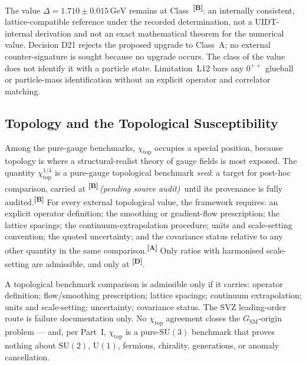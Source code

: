 \documentclass[12pt,a4paper,twoside]{article}
\theoremstyle{plain}
\theoremstyle{definition}
\theoremstyle{remark}
\newcommand{\GeV}{\,\mathrm{GeV}}
\newcommand{\catmark}[1]{\textsuperscript{\textsf{\textbf{[#1]}}}}
\newcommand{\Bpending}{\catmark{B}\,\textit{(pending source audit)}}
\newcommand{\DeltaGap}{1.710 \pm 0.015\GeV} %
\begin{document}
\begin{pioverridebox}
\label{box:pi-override-delta}
The value $\Delta=\DeltaGap$ remains at Class~\catmark{B}: an internally
consistent, lattice-compatible reference under the recorded determination,
not a UIDT-internal derivation and not an exact mathematical theorem for the
numerical value. Decision D21 rejects the proposed upgrade to Class~A; no
external counter-signature is sought because no upgrade occurs. The class of
the value does not identify it with a particle state. Limitation~L12 bars any
$0^{++}$ glueball or particle-mass identification without an explicit
operator and correlator matching.
\end{pioverridebox}

\subsection{Topology and the Topological Susceptibility}
\label{subsec:topology-chi}

Among the pure-gauge benchmarks, $\chi_{\mathrm{top}}$ occupies a
special position, because topology is where a structural-realist theory
of gauge fields is most exposed. The quantity
$\chi_{\mathrm{top}}^{1/4}$ is a pure-gauge topological benchmark
\emph{seed}: a target for post-hoc comparison, carried at \Bpending\
until its provenance is fully audited.\catmark{B} For every external
topological value, the framework requires: an explicit operator
definition; the smoothing or gradient-flow prescription; the lattice
spacings; the continuum-extrapolation procedure; units and scale-setting
convention; the quoted uncertainty; and the covariance status relative
to any other quantity in the same comparison.\catmark{A} Only ratios
with harmonised scale-setting are admissible, and only at \catmark{D}.

\begin{governancebox}
A topological benchmark comparison is admissible only if it carries:
operator definition; flow/smoothing prescription; lattice spacings;
continuum extrapolation; units and scale-setting; uncertainty;
covariance status. The SVZ leading-order route is failure documentation
only. No $\chi_{\mathrm{top}}$ agreement closes the
$G_{\mathrm{SM}}$-origin problem --- and, per Part~I, $\chi_{\mathrm{top}}$
is a pure-$\mathrm{SU}(3)$ benchmark that proves nothing about
$\mathrm{SU}(2)$, $\mathrm{U}(1)$, fermions, chirality, generations, or
anomaly cancellation.
\end{governancebox}
\end{document}
